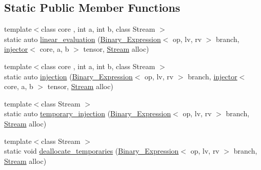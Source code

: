 \subsection*{Static Public Member Functions}
\begin{DoxyCompactItemize}
\item 
{\footnotesize template$<$class core , int a, int b, class Stream $>$ }\\static auto \hyperlink{structBC_1_1tensors_1_1exprs_1_1optimizer_3_01Binary__Expression_3_01op_00_01lv_00_01rv_01_4_00_183e68db6823926ca0c2e82552c93f0f_a34fff6ef0291da80e6ce7abb174cfdad}{linear\+\_\+evaluation} (\hyperlink{structBC_1_1tensors_1_1exprs_1_1Binary__Expression}{Binary\+\_\+\+Expression}$<$ op, lv, rv $>$ branch, \hyperlink{structBC_1_1tensors_1_1exprs_1_1injector}{injector}$<$ core, a, b $>$ tensor, \hyperlink{namespaceBC_abc64a63cd29a22d102a68f478dfd588d}{Stream} alloc)
\item 
{\footnotesize template$<$class core , int a, int b, class Stream $>$ }\\static auto \hyperlink{structBC_1_1tensors_1_1exprs_1_1optimizer_3_01Binary__Expression_3_01op_00_01lv_00_01rv_01_4_00_183e68db6823926ca0c2e82552c93f0f_af21abde6bc7576f241bdc879edf26ce3}{injection} (\hyperlink{structBC_1_1tensors_1_1exprs_1_1Binary__Expression}{Binary\+\_\+\+Expression}$<$ op, lv, rv $>$ branch, \hyperlink{structBC_1_1tensors_1_1exprs_1_1injector}{injector}$<$ core, a, b $>$ tensor, \hyperlink{namespaceBC_abc64a63cd29a22d102a68f478dfd588d}{Stream} alloc)
\item 
{\footnotesize template$<$class Stream $>$ }\\static auto \hyperlink{structBC_1_1tensors_1_1exprs_1_1optimizer_3_01Binary__Expression_3_01op_00_01lv_00_01rv_01_4_00_183e68db6823926ca0c2e82552c93f0f_ad72f9678672b67095d5d2a46b9f957e8}{temporary\+\_\+injection} (\hyperlink{structBC_1_1tensors_1_1exprs_1_1Binary__Expression}{Binary\+\_\+\+Expression}$<$ op, lv, rv $>$ branch, \hyperlink{namespaceBC_abc64a63cd29a22d102a68f478dfd588d}{Stream} alloc)
\item 
{\footnotesize template$<$class Stream $>$ }\\static void \hyperlink{structBC_1_1tensors_1_1exprs_1_1optimizer_3_01Binary__Expression_3_01op_00_01lv_00_01rv_01_4_00_183e68db6823926ca0c2e82552c93f0f_afa0ddc9c9dce2098747d0efee128fd5c}{deallocate\+\_\+temporaries} (\hyperlink{structBC_1_1tensors_1_1exprs_1_1Binary__Expression}{Binary\+\_\+\+Expression}$<$ op, lv, rv $>$ branch, \hyperlink{namespaceBC_abc64a63cd29a22d102a68f478dfd588d}{Stream} alloc)
\end{DoxyCompactItemize}
